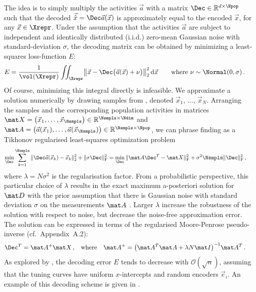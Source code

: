 The idea is to simply multiply the activities $\vec a$ with a matrix $\Dec \in \mathbb{R}^{d \times \Npop}$ such that the decoded $\vec{\hat x} = \Dec \vec a(\vec x)$ is approximately equal to the encoded $\vec x$, for any $\vec x \in \Xrepr$.
Under the assumption that the activities $\vec a$ are subject to independent and identically distributed (i.i.d.) zero-mean Gaussian noise with standard-deviation $\sigma$, the decoding matrix \Dec can be obtained by minimizing a least-squares loss-function $E$:
\begin{align}
	E &= \frac{1}{\vol(\Xrepr)} \iint_{\Xrepr} \bigl\| \vec x - \Dec \bigl( \vec a(\vec x) + \nu \bigr) \bigr\|_2^2  \, \mathrm{d}\vec{x} \quad\quad \text{where } \nu \sim \Normal(0, \sigma) \,.
	\label{eqn:lstsq_loss_identity}
\end{align}
Of course, minimizing this integral directly is infeasible.
We approximate a solution numerically by drawing \Nsmpls samples from \Xrepr, denoted $\vec x_1$, $\ldots$, $\vec x_N$.
Arranging the samples and the corresponding population activities in matrices $\mat X = \begin{pmatrix} \vec x_1, \ldots, \vec x_{\Nsmpls} \end{pmatrix} \in \mathbb{R}^{\Nsmpls \times \Ndim}$ and $\mat A = \begin{pmatrix}\vec a(\vec x_1), \ldots, \vec a(\vec x_{\Nsmpls})\end{pmatrix} \in \mathbb{R}^{\Nsmpls \times \Npop}$, we can phrase finding \Dec as a Tikhonov regularised least-squares optimization problem
\begin{align}
\min_{\Dec} \sum_{k = 1}^{\Nsmpls} \| \Dec \vec a(\vec x_k) - \vec x_k \|_2^2  + \| \sigma \Dec \|^2_\mathrm{F}
&= \min_{\Dec} \| \mat A \Dec^T - \mat X \|_\mathrm{F}^2 + \sigma^2 \Nsmpls \| \Dec \|_\mathrm{F}^2 \,,
\label{eqn:lstsq_loss}
\end{align}
where $\lambda = N \sigma^2$ is the regularisation factor.
From a probabilistic perspective, this particular choice of $\lambda$ results in the exact maximum a-posteriori solution for $\mat D$ with the prior assumption that there is Gaussian noise with standard deviation $\sigma$ on the measurements $\mat A$ \citep[Chapter~6]{boyd2004convex}. 
Larger $\lambda$ increase the robustness of the solution with respect to noise, but decrease the noise-free approximation error.
The solution can be expressed in terms of the regularised Moore-Penrose pseudo-inverse (cf.~Appendix~A.2):
\begin{align}
\Dec^T &= \mat A^+ \mat X \,, &\text{where} \quad \mat A^+ &= \bigl(\mat A^T \mat A + \lambda N \mat I \bigr)^{-1} \mat A^T \,.
\label{eqn:decoding}
\end{align}
As explored by \citet[Chapter~2]{eliasmith2003neural}, the decoding error $E$ tends to decrease with $\mathcal{O}(\sqrt{n})$, assuming that the tuning curves have uniform $x$-intercepts and random encoders $\vec e_i$.
An example of this decoding scheme is given in .

